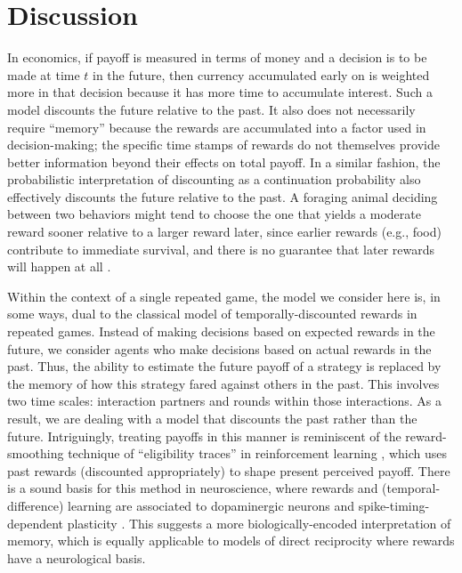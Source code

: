 \documentclass[11pt]{article}
\theoremstyle{plainCl1}
\theoremstyle{plainCl2}
\begin{document}
\section{Discussion}\label{section:discussion}
%
In economics, if payoff is measured in terms of money and a decision is to be made at time $t$ in the future, then currency accumulated early on is weighted more in that decision because it has more time to accumulate interest. Such a model discounts the future relative to the past. It also does not necessarily require ``memory'' because the rewards are accumulated into a factor used in decision-making; the specific time stamps of rewards do not themselves provide better information beyond their effects on total payoff. In a similar fashion, the probabilistic interpretation of discounting as a continuation probability \citep{axelrod1981evolution} also effectively discounts the future relative to the past. A foraging animal deciding between two behaviors might tend to choose the one that yields a moderate reward sooner relative to a larger reward later, since earlier rewards (e.g., food) contribute to immediate survival, and there is no guarantee that later rewards will happen at all \citep{stephens1986foraging}.

Within the context of a single repeated game, the model we consider here is, in some ways, dual to the classical model of temporally-discounted rewards in repeated games. Instead of making decisions based on expected rewards in the future, we consider agents who make decisions based on actual rewards in the past. Thus, the ability to estimate the future payoff of a strategy is replaced by the memory of how this strategy fared against others in the past. This involves two time scales: interaction partners and rounds within those interactions. As a result, we are dealing with a model that discounts the past rather than the future. Intriguingly, treating payoffs in this manner is reminiscent of the reward-smoothing technique of ``eligibility traces'' in reinforcement learning \citep{sutton:MIT:2018}, which uses past rewards (discounted appropriately) to shape present perceived payoff. There is a sound basis for this method in neuroscience, where rewards and (temporal-difference) learning are associated to dopaminergic neurons \citep{schultz:JN:1998} and spike-timing-dependent plasticity \citep{dan:Neuron:2004}. This suggests a more biologically-encoded interpretation of memory, which is equally applicable to models of direct reciprocity where rewards have a neurological basis.
\end{document}
